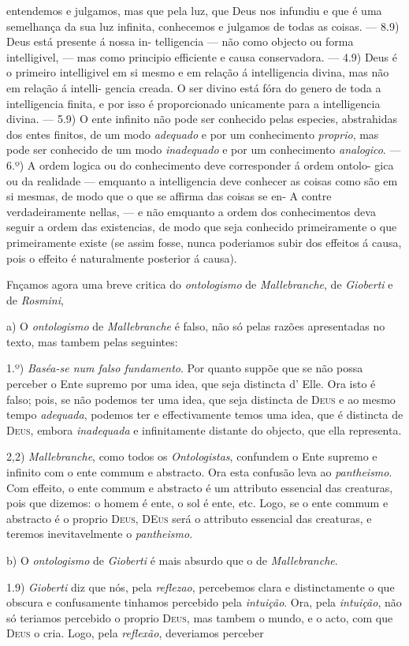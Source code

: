 entendemos e julgamos, mas que pela luz, que Deus nos infundiu e que é uma semelhança da sua luz infinita, conhecemos e julgamos de todas as coisas. --- 8.9) Deus está presente á nossa in- \textbar{} telligencia --- não como objecto ou forma intelligivel, --- mas como principio \textbar{} efficiente e causa conservadora. --- 4.9) Deus é o primeiro intelligivel em si \textbar{} mesmo e em relação á intelligencia divina, mas não em relação á intelli- \textbar{} gencia creada. O ser divino está fóra do genero de toda a intelligencia finita, \textbar{} e por isso é proporcionado unicamente para a intelligencia divina. --- 5.9) O \textbar{} ente infinito não pode ser conhecido pelas especies, abstrahidas dos entes finitos, de um modo \emph{adequado} e por um conhecimento \emph{proprio}, mas pode \textbar{} ser conhecido de um modo \emph{inadequado} e por um conhecimento \emph{analogico}. --- \textbar{} 6.º) A ordem logica ou do conhecimento deve corresponder á ordem ontolo- \textbar{} gica ou da realidade --- emquanto a intelligencia deve conhecer as coisas \textbar{} como são em si mesmas, de modo que o que se affirma das coisas se en- A contre verdadeiramente nellas, --- e não emquanto a ordem dos conhecimentos \textbar{}deva seguir a ordem das existencias, de modo que seja conhecido primeiramente o que primeiramente existe (se assim fosse, nunca poderiamos subir dos effeitos á causa, pois o effeito é naturalmente posterior á causa).\par Fnçamos agora uma breve critica do \emph{ontologismo} de \emph{Mallebranche}, de \emph{Gioberti} e de \emph{Rosmini},\par a) O \emph{ontologismo} de \emph{Mallebranche} é falso, não só pelas razões apresentadas no texto, mas tambem pelas seguintes:\par 1.º) \emph{Baséa-se num falso fundamento}. Por quanto suppõe que se não possa perceber o Ente supremo por uma idea, que seja distincta d' Elle. Ora isto é falso; pois, se não podemos ter uma idea, que seja distincta de \textsc{Deus} e ao mesmo tempo \emph{adequada}, podemos ter e effectivamente temos uma idea, que é distincta de \textsc{Deus}, embora \emph{inadequada} e infinitamente distante do objecto, que ella representa.\par 2,2) \emph{Mallebranche}, como todos os \emph{Ontologistas}, confundem o Ente supremo e infinito com o ente commum e abstracto. Ora esta confusão leva ao \emph{pantheismo}. Com effeito, o ente commum e abstracto é um attributo essencial das creaturas, pois que dizemos: o homem é ente, o sol é ente, etc. Logo, se o ente commum e abstracto é o proprio \textsc{Deus}, \textsc{DEus} será o attributo essencial das creaturas, e teremos inevitavelmente o \emph{pantheismo}.\par b) O \emph{ontologismo} de \emph{Gioberti} é mais absurdo que o de \emph{Mallebranche}.\par 1.9) \emph{Gioberti} diz que nós, pela \emph{reflezao}, percebemos clara e distinctamente o que obscura e confusamente tinhamos percebido pela \emph{intuição}. Ora, pela \emph{intuição}, não só teriamos percebido o proprio \textsc{Deus}, mas tambem o mundo, e o acto, com que \textsc{Deus} o cria. Logo, pela \emph{reflexão}, deveriamos perceber 